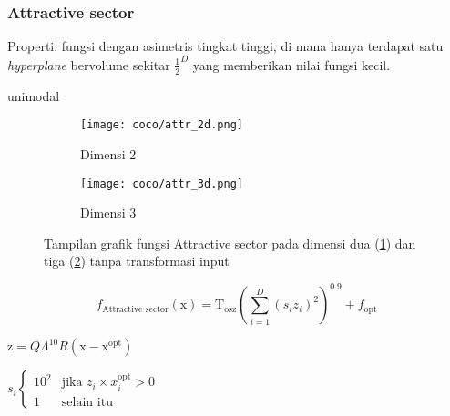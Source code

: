 \subsubsection*{Attractive sector}
\noindent Properti:
fungsi dengan asimetris tingkat tinggi, di mana hanya terdapat satu \textit{hyperplane} bervolume sekitar $\frac{1}{2}^D$ yang memberikan nilai fungsi kecil.
\begin{packed_item}
  \item unimodal
\end{packed_item}
\begin{figure}[H]
	\centering
	\begin{subfigure}[b]{0.4\textwidth}
		\centering
		\texttt{[image: coco/attr\_2d.png]}
		\caption{Dimensi 2}
		\label{fig:attr-2d}
	\end{subfigure}
	\hfill
	\begin{subfigure}[b]{0.4\textwidth}
		\centering
		\texttt{[image: coco/attr\_3d.png]}
		\caption{Dimensi 3}
		\label{fig:attr-3d}
	\end{subfigure}
	\caption{Tampilan grafik fungsi Attractive sector pada dimensi dua (\cref{fig:attr-2d}) dan tiga (\cref{fig:attr-3d}) tanpa transformasi input}
	\label{fig:atrr}
\end{figure}
\begin{equation}
  f_{\text{Attractive sector}}(\mathrm{x})=\mathrm{T}_{\text{osz}}(\sum_{i=1}^{D}(s_iz_i)^2)^{0.9}+f_{\text{opt}}
\end{equation}
\begin{packed_item}
    \item $\mathrm{z}=Q\Lambda^{10}R(\mathrm{x}-\mathrm{x}^{\text{opt}})$
    \item $s_i\begin{cases}
      10^2 & \text{jika }z_i\times x_i^{\text{opt}}>0\\
      1 & \text{selain itu}
    \end{cases}$
\end{packed_item}

